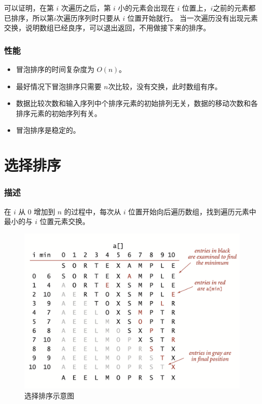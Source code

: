 可以证明，在第 $i$ 次遍历之后，第 $i$ 小的元素会出现在 $i$ 位置上，$i$之前的元素都已排序，所以第$i$次遍历序列时只要从 $i$ 位置开始就行。%
当一次遍历没有出现元素交换，说明数组已经良序，可以退出返回，不用做接下来的排序。

\subsubsection{性能}
\begin{itemize}
    \item 冒泡排序的时间复杂度为 $O(n)$。
    \item 最好情况下冒泡排序只需要 $n$次比较，没有交换，此时数组有序。
    \item 数据比较次数和输入序列中个排序元素的初始排列无关，数据的移动次数和各排序元素的初始序列有关。 
    \item 冒泡排序是稳定的。
\end{itemize}


\section{选择排序}

\subsubsection{描述}
在 $i$ 从 $0$ 增加到 $n$ 的过程中，每次从 $i$ 位置开始向后遍历数组，找到遍历元素中最小的与 $i$ 位置元素交换。

\begin{figure}[H]
    \centering
    \includegraphics[width=14.5cm]{src/selection.png}
    \caption{选择排序示意图}
\end{figure}

